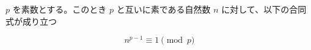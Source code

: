 %

\begin{theorem}

$p$ を素数とする。このとき $p$ と互いに素である自然数 $n$ に対して、以下の合同式が成り立つ

\[
n^{p-1} \equiv 1 \pmod{p}
\]

\end{theorem}

